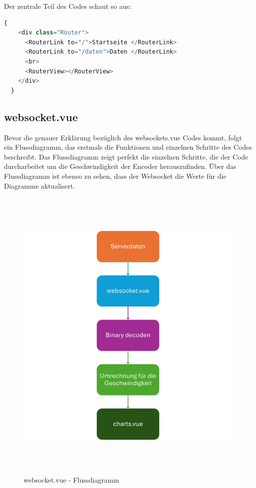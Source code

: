 Der zentrale Teil des Codes schaut so aus:
\begin{lstlisting}[language=JavaScript, gobble=4]
  {
    <div class="Router">
      <RouterLink to="/">Startseite </RouterLink>
      <RouterLink to="/daten">Daten </RouterLink>
      <br>
      <RouterView></RouterView>
    </div>
  }
\end{lstlisting}

\subsection{websocket.vue}
\label{subsec:frontend_websocket.vue}

Bevor die genauer Erklärung bezüglich des websockets.vue Codes kommt,
folgt ein Flussdiagramm, das erstmals die Funktionen und einzelnen Schritte
des Codes beschreibt.
%
Das Flussdiagramm zeigt perfekt die einzelnen Schritte, 
die der Code durcharbeitet um die Geschwindigkeit der Encoder herauszufinden.
Über das Flussdiagramm ist ebenso zu sehen, 
dass der Websocket die Werte für die Diagramme aktualisert. 
%

\begin{figure}[H]
  \includegraphics[width=\textwidth, height=14.8cm, center]{img/Websocket_FD.png}
  \caption{websocket.vue - Flussdiagramm}
  \label{fig:websocket_Flowchart}
\end{figure}


